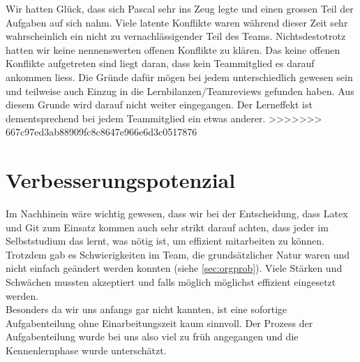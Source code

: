 Wir hatten Glück, dass sich Pascal sehr ins Zeug legte und einen grossen Teil der Aufgaben auf sich nahm. Viele latente Konflikte waren während dieser Zeit sehr wahrscheinlich ein nicht zu vernachlässigender Teil des Teams. Nichtsdestotrotz hatten wir keine nennenswerten offenen Konflikte zu klären. Das keine offenen Konflikte aufgetreten sind liegt daran, dass kein Teammitglied es darauf ankommen liess. Die Gründe dafür mögen bei jedem unterschiedlich gewesen sein und teilweise auch Einzug in die Lernbilanzen/Teamreviews gefunden haben. Aus diesem Grunde wird darauf nicht weiter eingegangen. Der Lerneffekt ist dementsprechend bei jedem Teammitglied ein etwas anderer.
>>>>>>> 667c97ed3ab88909fc8c8647e966e6d3c0517876

\section{Verbesserungspotenzial}

Im Nachhinein wäre wichtig gewesen, dass wir bei der Entscheidung, dass Latex und Git zum Einsatz kommen auch sehr strikt darauf achten, dass jeder im Selbststudium das lernt, was nötig ist, um effizient mitarbeiten zu können. \\
Trotzdem gab es Schwierigkeiten im Team, die grundsätzlicher Natur waren und nicht einfach geändert werden konnten (siehe \ref{sec:orgprob}). Viele Stärken und Schwächen mussten akzeptiert und falls möglich möglichst effizient eingesetzt werden. \\
Besonders da wir uns anfangs gar nicht kannten, ist eine sofortige Aufgabenteilung ohne Einarbeitungszeit kaum sinnvoll. Der Prozess der Aufgabenteilung wurde bei uns also viel zu früh angegangen und die Kennenlernphase wurde unterschätzt. 
